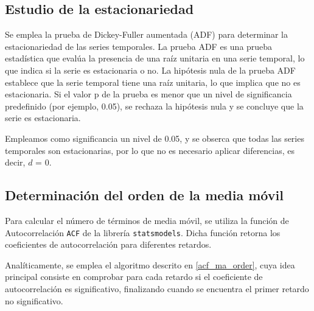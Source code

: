 \subsection{Estudio de la estacionariedad}
Se emplea la prueba de Dickey-Fuller aumentada (ADF) para determinar la estacionariedad de las series temporales.
La prueba ADF es una prueba estadística que evalúa la presencia de una raíz unitaria en una serie temporal, lo que indica si la serie es estacionaria o no.
La hipótesis nula de la prueba ADF establece que la serie temporal tiene una raíz unitaria, lo que implica que no es estacionaria.
Si el valor p de la prueba es menor que un nivel de significancia predefinido (por ejemplo, 0.05), se rechaza la hipótesis nula y se concluye que la serie es estacionaria.

Empleamos como significancia un nivel de 0.05, y se obserca que todas las series temporales son estacionarias, por lo que no es necesario aplicar diferencias, 
es decir, $d$ = 0.

\subsection{Determinación del orden de la media móvil}
Para calcular el número de términos de media móvil, se utiliza la función de Autocorrelación \texttt{ACF} de la librería \texttt{statsmodels}. Dicha función 
retorna los coeficientes de autocorrelación para diferentes retardos.

Analíticamente, se emplea el algoritmo descrito en \ref{acf_ma_order}, cuya idea principal consiste en comprobar para cada retardo si el 
coeficiente de autocorrelación es significativo, finalizando cuando se encuentra el primer retardo no significativo. 

